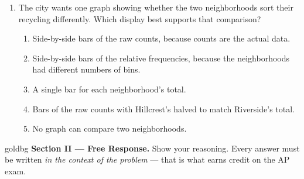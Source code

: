 \documentclass[12pt]{article}
\begin{document}
\begin{enumerate}[leftmargin=1.9em, itemsep=0.13in]
  \item The city wants one graph showing whether the two neighborhoods sort their recycling
        differently. Which display best supports that comparison?
        \begin{enumerate}[label=\textbf{(\Alph*)}, leftmargin=2.2em, itemsep=2pt]
          \item Side-by-side bars of the raw counts, because counts are the actual data.
          \item Side-by-side bars of the relative frequencies, because the neighborhoods had
                different numbers of bins.
          \item A single bar for each neighborhood's total.
          \item Bars of the raw counts with Hillcrest's halved to match Riverside's total.
          \item No graph can compare two neighborhoods.
                \hfill{}
        \end{enumerate}

\end{enumerate}

\vspace{0.14in}

\boxguard[16]
\begin{headlinebox}{goldbg}
\small
\textbf{Section II --- Free Response.} Show your reasoning. Every answer must be written
\emph{in the context of the problem} --- that is what earns credit on the AP exam.
\end{headlinebox}

\vspace{0.10in}
\end{document}
